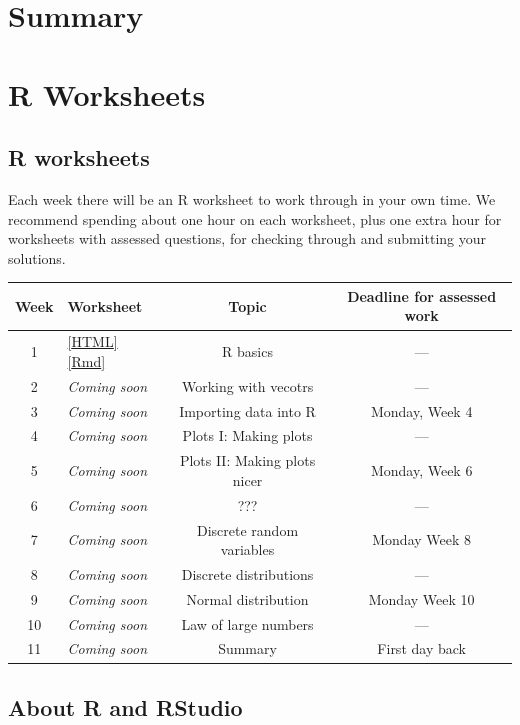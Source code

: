 \documentclass[
  a4paper,
]{book}
\theoremstyle{definition}
\theoremstyle{definition}
\theoremstyle{definition}
\theoremstyle{remark}
\begin{document}
\hypertarget{S11-summary}{%
\chapter{Summary}\label{S11-summary}}

\hypertarget{R}{%
\chapter*{R Worksheets}\label{R}}

\hypertarget{r-work}{%
\section*{R worksheets}\label{r-work}}

Each week there will be an R worksheet to work through in your own time. We recommend spending about one hour on each worksheet, plus one extra hour for worksheets with assessed questions, for checking through and submitting your solutions.

\begin{longtable}[]{@{}clcc@{}}
\toprule
Week & Worksheet & Topic & Deadline for assessed work \\
\midrule
\endhead
1 & \href{R3.html}{{[}HTML{]}} \href{R3.Rmd}{{[}Rmd{]}} & R basics & --- \\
2 & \emph{Coming soon} & Working with vecotrs & --- \\
3 & \emph{Coming soon} & Importing data into R & Monday, Week 4 \\
4 & \emph{Coming soon} & Plots I: Making plots & --- \\
5 & \emph{Coming soon} & Plots II: Making plots nicer & Monday, Week 6 \\
6 & \emph{Coming soon} & ??? & --- \\
7 & \emph{Coming soon} & Discrete random variables & Monday Week 8 \\
8 & \emph{Coming soon} & Discrete distributions & --- \\
9 & \emph{Coming soon} & Normal distribution & Monday Week 10 \\
10 & \emph{Coming soon} & Law of large numbers & --- \\
11 & \emph{Coming soon} & Summary & First day back \\
\bottomrule
\end{longtable}

\hypertarget{about-r}{%
\section*{About R and RStudio}\label{about-r}}
\end{document}

